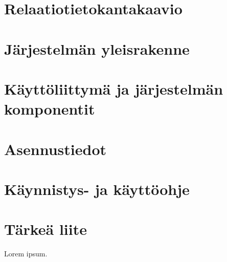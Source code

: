 \documentclass[12pt,a4paper,titlepage]{article}
\begin{document}
\section{Relaatiotietokantakaavio}

\section{Järjestelmän yleisrakenne}

\section{Käyttöliittymä ja järjestelmän komponentit}

\section{Asennustiedot}

\section{Käynnistys- ja käyttöohje}




\small


\appendix
\section{Tärkeä liite}
Lorem ipsum.
\newpage
\end{document}
